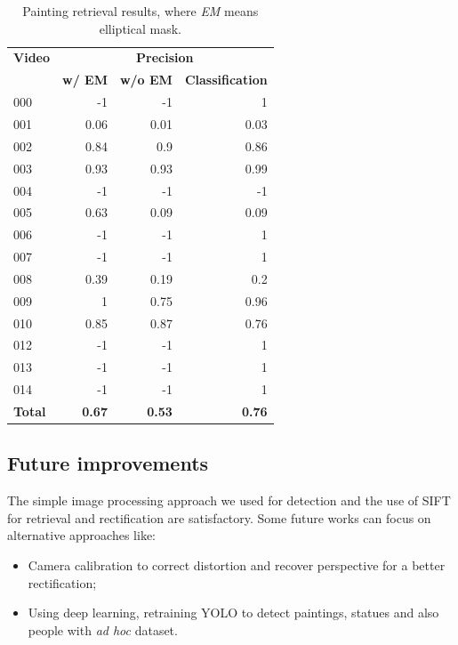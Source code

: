 \documentclass[10pt,twocolumn,letterpaper]{article}
\begin{document}
\begin{table}[]
\begin{center}
\begin{tabular}{lrrr}
\multicolumn{1}{c}{\textbf{Video}} & \multicolumn{3}{c}{\textbf{Precision}} \\
\multicolumn{1}{c}{} & \multicolumn{1}{c}{\textbf{w/ EM}} & \multicolumn{1}{c}{\textbf{w/o EM}} & \multicolumn{1}{c}{\textbf{Classification}} \\ \hline \hline
000 & -1 & -1 & 1 \\
001 & 0.06 & 0.01 & 0.03 \\
002 & 0.84 & 0.9 & 0.86 \\
003 & 0.93 & 0.93 & 0.99 \\
004 & -1 & -1 & -1 \\
005 & 0.63 & 0.09 & 0.09 \\
006 & -1 & -1 & 1 \\
007 & -1 & -1 & 1 \\
008 & 0.39 & 0.19 & 0.2 \\
009 & 1 & 0.75 & 0.96 \\
010 & 0.85 & 0.87 & 0.76 \\
012 & -1 & -1 & 1 \\
013 & -1 & -1 & 1 \\
014 & -1 & -1 & 1 \\ \hline \hline
\textbf{Total} & \textbf{0.67} & \textbf{0.53} & \textbf{0.76}
\end{tabular}
\end{center}
\caption{Painting retrieval results, where \textit{EM} means elliptical mask.}
\label{tab:PaintingRetrievalResults}
\end{table}

\subsection{Future improvements}
\label{subsec:FutureImprovements}
The simple image processing approach we used for detection and the use of SIFT for retrieval and rectification are satisfactory. Some future works can focus on alternative approaches like:
\begin{itemize}
    \item Camera calibration to correct distortion and recover perspective for a better rectification;
    \item Using deep learning, \eg retraining YOLO to detect paintings, statues and also people with \textit{ad hoc} dataset.
\end{itemize}

{\small


}
\end{document}
